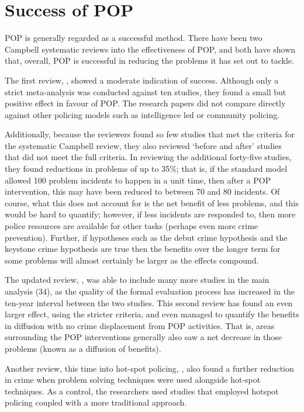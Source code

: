 \section{Success of POP} POP is generally regarded as a successful method. There have been two Campbell systematic reviews into the effectiveness of POP, and both have shown that, overall, POP is successful in reducing the problems it has set out to tackle. 

The first review, \parencite{popeffective}, showed a moderate indication of success. Although only a strict meta-analysis was conducted against ten studies, they found a small but positive effect in favour of POP. The research papers did not compare directly against other policing models such as intelligence led or community policing.

Additionally, because the reviewers found so few studies that met the criteria for the systematic Campbell review, they also reviewed ‘before and after’ studies that did not meet the full criteria. In reviewing the additional forty-five  studies, they found reductions in problems of up to 35\%; that is, if the standard model allowed 100 problem incidents to happen in a unit time, then after a POP intervention, this may have been reduced to between 70 and 80 incidents. Of course, what this does not account for is the net benefit of less problems, and this would be hard to quantify; however, if less incidents are responded to, then more police resources are available for other tasks (perhaps even more crime prevention). Further, if hypotheses such as the debut crime hypothesis and the keystone crime hypothesis  \parencite{farrell2015debuts} are true then the benefits over the longer term for some problems will almost certainly be larger as the effects compound. 

The updated review,  \parencite{hinkle2020problem}, was able to include many more studies in the main analysis (34), as the quality of the formal evaluation process has increased in the ten-year interval between the two studies. This second review has found an even larger effect, using the stricter criteria, and even managed to quantify the benefits in diffusion with no crime displacement from POP activities. That is, areas surrounding the POP interventions generally also saw a net decrease in those problems (known as a diffusion of benefits).

Another review, this time into hot-spot policing, \parencite{braga2014effects}, also found a further reduction in crime when problem solving techniques were used alongside hot-spot techniques. As a control, the researchers used studies that employed hotspot policing coupled with a more traditional approach.

